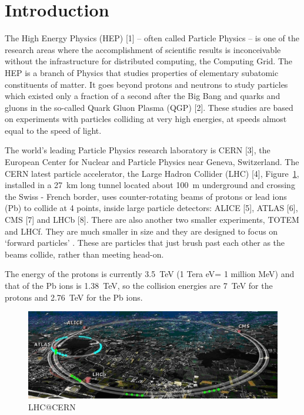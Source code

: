 



\maketitle

\section{Introduction}

The High Energy Physics (HEP) [1] -- often called Particle
Physics -- is one of the research areas where the accomplishment of
scientific results is  inconceivable without the infrastructure for
distributed computing, the Computing Grid. The HEP is a branch of
Physics that studies properties of elementary subatomic constituents
of matter. It goes beyond protons and neutrons to study particles
which existed only a fraction of a second after the Big Bang and
quarks and gluons in the so-called Quark Gluon Plasma (QGP) [2].
These studies are based on experiments with particles colliding at
very high energies, at speeds almost equal to the speed of light.

The world's leading Particle Physics research laboratory is CERN
[3], the European Center for Nuclear and Particle Physics near
Geneva, Switzerland. The CERN latest particle accelerator, the Large
Hadron Collider (LHC) [4], Figure~\ref{fig01}, installed in a 27~km
long tunnel located about 100~m underground and crossing the Swiss -
French border, uses counter-rotating beams of protons or lead ions (Pb)
to collide at 4 points, inside large particle detectors: ALICE
[5], ATLAS [6], CMS [7] and LHCb [8]. There are also another two smaller
 experiments,  TOTEM and LHCf. They are much smaller in size and they are designed
 to focus on ‘forward particles’ . These are particles that just brush past each other 
as the beams collide, rather than meeting head-on.

The energy of the protons is
currently 3.5~TeV (1 Tera eV= 1 million MeV) and that of the Pb ions is
1.38~TeV, so the collision energies are 7~TeV for the protons and
2.76~TeV for the Pb ions.

\begin{figure}[htb] %
\centering
\includegraphics[width=13cm]{fig01.eps} %
\caption{LHC@CERN}\label{fig01}
\end{figure}



